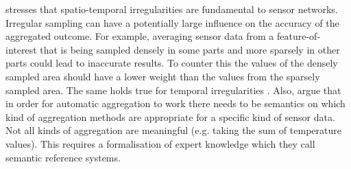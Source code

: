 \cite{SW:Ganesan} stresses that spatio-temporal irregularities are fundamental to sensor networks. Irregular sampling can have a potentially large influence on the accuracy of the aggregated outcome. For example, averaging sensor data from a feature-of-interest that is being sampled densely in some parts and more sparsely in other parts could lead to inaccurate results. To counter this the values of the densely sampled area should have a lower weight than the values from the sparsely sampled area. The same holds true for temporal irregularities \citep{SW:Ganesan}. Also, \cite{SSW:Stasch4} argue that in order for automatic aggregation to work there needs to be semantics on which kind of aggregation methods are appropriate for a specific kind of sensor data. Not all kinds of aggregation are meaningful (e.g. taking the sum of temperature values). This requires a formalisation of expert knowledge which they call semantic reference systems. 




